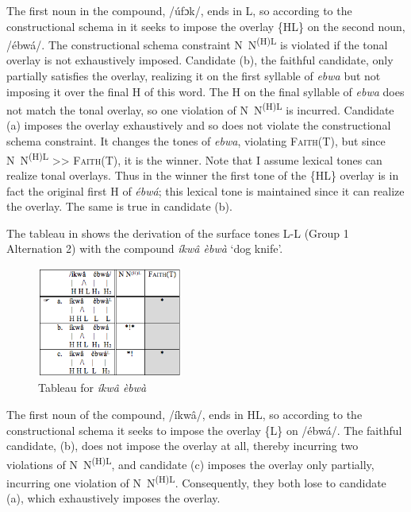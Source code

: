 \documentclass[output=paper]{langscibook}
\begin{document}
The first noun in the compound, /úfɔk/, ends in L, so according to the constructional schema in  it seeks to impose the overlay \{HL\} on the second noun, /ébwá/. The constructional schema constraint N~N\textsuperscript{(H)L} is violated if the tonal overlay is not exhaustively imposed. Candidate (b), the faithful candidate, only partially satisfies the overlay, realizing it on the first syllable of \textit{ebwa} but not imposing it over the final H of this word. The H on the final syllable of \textit{ebwa} does not match the tonal overlay, so one violation of N~N\textsuperscript{(H)L} is incurred. Candidate (a) imposes the overlay exhaustively and so does not violate the constructional schema constraint. It changes the tones of \textit{ebwa}, violating \textsc{Faith(T)}, but since N~N\textsuperscript{(H)L} {>}{>} \textsc{Faith(T)}, it is the winner. Note that I assume lexical tones can realize tonal overlays. Thus in the winner the first tone of the \{HL\} overlay is in fact the original first H of \textit{ébwá}; this lexical tone is maintained since it can realize the overlay. The same is true in candidate (b). 

The tableau in  shows the derivation of the surface tones L-L (Group 1 Alternation 2) with the compound \textit{íkwâ èbwà} ‘dog knife’. 

  
\begin{figure}
\includegraphics[width=48mm]{figures/glewwe-img3.png}
\caption{Tableau for \textit{íkwâ èbwà}}
\label{fig:glewwe:4}
\end{figure}

The first noun of the compound, /íkwâ/, ends in HL, so according to the constructional schema it seeks to impose the overlay \{L\} on /ébwá/. The faithful candidate, (b), does not impose the overlay at all, thereby incurring two violations of N~N\textsuperscript{(H)L}, and candidate (c) imposes the overlay only partially, incurring one violation of N~N\textsuperscript{(H)L}. Consequently, they both lose to candidate (a), which exhaustively imposes the overlay.     
\end{document}
